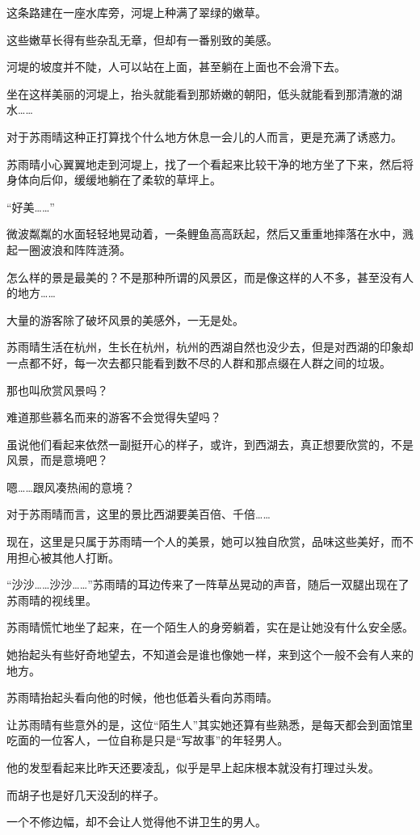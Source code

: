 这条路建在一座水库旁，河堤上种满了翠绿的嫩草。

这些嫩草长得有些杂乱无章，但却有一番别致的美感。

河堤的坡度并不陡，人可以站在上面，甚至躺在上面也不会滑下去。

坐在这样美丽的河堤上，抬头就能看到那娇嫩的朝阳，低头就能看到那清澈的湖水……

对于苏雨晴这种正打算找个什么地方休息一会儿的人而言，更是充满了诱惑力。

苏雨晴小心翼翼地走到河堤上，找了一个看起来比较干净的地方坐了下来，然后将身体向后仰，缓缓地躺在了柔软的草坪上。

“好美……”

微波粼粼的水面轻轻地晃动着，一条鲤鱼高高跃起，然后又重重地摔落在水中，溅起一圈波浪和阵阵涟漪。

怎么样的景是最美的？不是那种所谓的风景区，而是像这样的人不多，甚至没有人的地方……

大量的游客除了破坏风景的美感外，一无是处。

苏雨晴生活在杭州，生长在杭州，杭州的西湖自然也没少去，但是对西湖的印象却一点都不好，每一次去都只能看到数不尽的人群和那点缀在人群之间的垃圾。

那也叫欣赏风景吗？

难道那些慕名而来的游客不会觉得失望吗？

虽说他们看起来依然一副挺开心的样子，或许，到西湖去，真正想要欣赏的，不是风景，而是意境吧？

嗯……跟风凑热闹的意境？

对于苏雨晴而言，这里的景比西湖要美百倍、千倍……

现在，这里是只属于苏雨晴一个人的美景，她可以独自欣赏，品味这些美好，而不用担心被其他人打断。

“沙沙……沙沙……”苏雨晴的耳边传来了一阵草丛晃动的声音，随后一双腿出现在了苏雨晴的视线里。

苏雨晴慌忙地坐了起来，在一个陌生人的身旁躺着，实在是让她没有什么安全感。

她抬起头有些好奇地望去，不知道会是谁也像她一样，来到这个一般不会有人来的地方。

苏雨晴抬起头看向他的时候，他也低着头看向苏雨晴。

让苏雨晴有些意外的是，这位“陌生人”其实她还算有些熟悉，是每天都会到面馆里吃面的一位客人，一位自称是只是“写故事”的年轻男人。

他的发型看起来比昨天还要凌乱，似乎是早上起床根本就没有打理过头发。

而胡子也是好几天没刮的样子。

一个不修边幅，却不会让人觉得他不讲卫生的男人。

